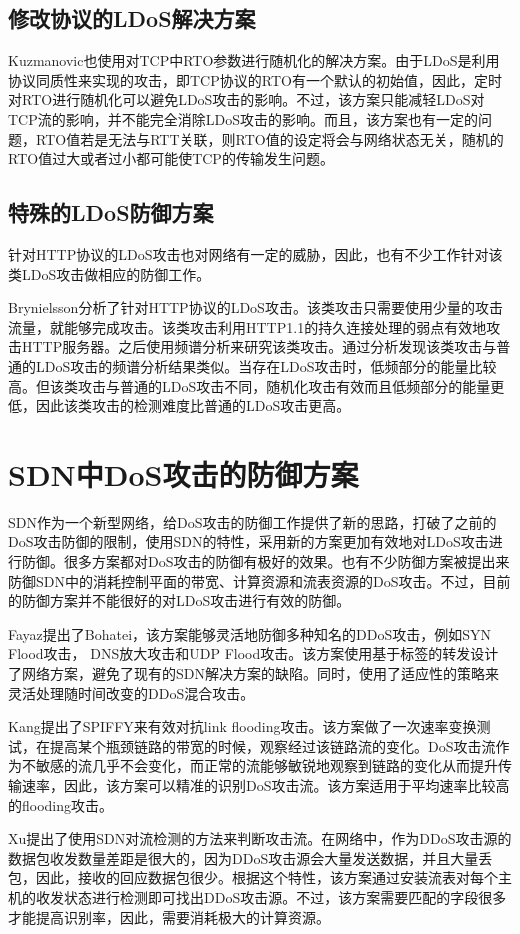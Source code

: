 \subsection{修改协议的LDoS解决方案}
\label{chap2:promodify}
Kuzmanovic\cite{Kuzmanovic2006Low}也使用对TCP中RTO参数进行随机化的解决方案。由于LDoS是利用协议同质性来实现的攻击，即TCP协议的RTO有一个默认的初始值，因此，定时对RTO进行随机化可以避免LDoS攻击的影响。不过，该方案只能减轻LDoS对TCP流的影响，并不能完全消除LDoS攻击的影响。而且，该方案也有一定的问题，RTO值若是无法与RTT关联，则RTO值的设定将会与网络状态无关，随机的RTO值过大或者过小都可能使TCP的传输发生问题。


\subsection{特殊的LDoS防御方案}
\label{chap2:special-LDoS-Defense}
针对HTTP协议的LDoS攻击也对网络有一定的威胁，因此，也有不少工作针对该类LDoS攻击做相应的防御工作。

Brynielsson\cite{brynielsson2015detectability}分析了针对HTTP协议的LDoS攻击。该类攻击只需要使用少量的攻击流量，就能够完成攻击。该类攻击利用HTTP1.1的持久连接处理的弱点有效地攻击HTTP服务器。之后使用频谱分析来研究该类攻击。通过分析发现该类攻击与普通的LDoS攻击的频谱分析结果类似。当存在LDoS攻击时，低频部分的能量比较高。但该类攻击与普通的LDoS攻击不同，随机化攻击有效而且低频部分的能量更低，因此该类攻击的检测难度比普通的LDoS攻击更高。






\section{SDN中DoS攻击的防御方案}
SDN作为一个新型网络，给DoS攻击的防御工作提供了新的思路，打破了之前的DoS攻击防御的限制，使用SDN的特性，采用新的方案更加有效地对LDoS攻击进行防御。很多方案\cite{b9, b16, b10}都对DoS攻击的防御有极好的效果。也有不少防御方案\cite{b10, b12, b13, b15, b18,wang2015floodguard,zhang2017ftguard}被提出来防御SDN中的消耗控制平面的带宽、计算资源和流表资源的DoS攻击\cite{shin2013avant,cao2017disrupting}。不过，目前的防御方案并不能很好的对LDoS攻击进行有效的防御。


Fayaz\cite{b9}提出了Bohatei，该方案能够灵活地防御多种知名的DDoS攻击，例如SYN Flood攻击， DNS放大攻击和UDP Flood攻击。该方案使用基于标签的转发设计了网络方案，避免了现有的SDN解决方案的缺陷。同时，使用了适应性的策略来灵活处理随时间改变的DDoS混合攻击。

Kang\cite{b16}提出了SPIFFY来有效对抗link flooding攻击。该方案做了一次速率变换测试，在提高某个瓶颈链路的带宽的时候，观察经过该链路流的变化。DoS攻击流作为不敏感的流几乎不会变化，而正常的流能够敏锐地观察到链路的变化从而提升传输速率，因此，该方案可以精准的识别DoS攻击流。该方案适用于平均速率比较高的flooding攻击。

Xu\cite{b10}提出了使用SDN对流检测的方法来判断攻击流。在网络中，作为DDoS攻击源的数据包收发数量差距是很大的，因为DDoS攻击源会大量发送数据，并且大量丢包，因此，接收的回应数据包很少。根据这个特性，该方案通过安装流表对每个主机的收发状态进行检测即可找出DDoS攻击源。不过，该方案需要匹配的字段很多才能提高识别率，因此，需要消耗极大的计算资源。


